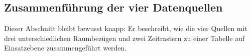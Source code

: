 \documentclass[12pt,a4paper]{article}
\begin{document}

\subsection{Zusammenführung der vier Datenquellen}
\label{sec:integration}

Dieser Abschnitt bleibt bewusst knapp: Er beschreibt, wie die vier Quellen mit
drei unterschiedlichen Raumbezügen und zwei Zeitrastern zu einer Tabelle auf
Einsatzebene zusammengeführt werden.
\end{document}
